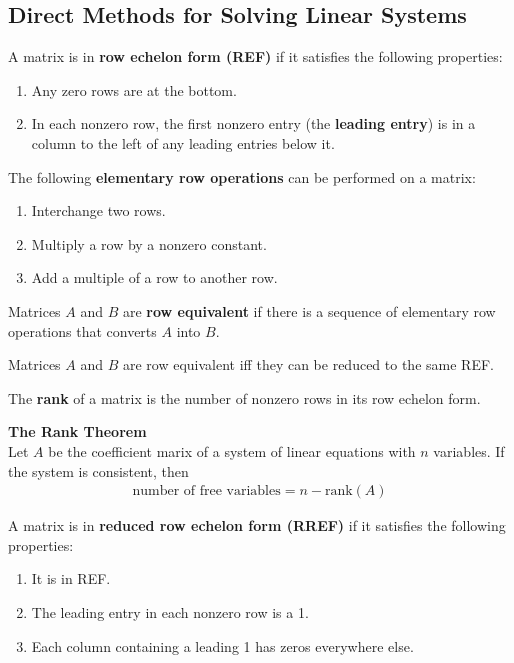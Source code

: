 \documentclass{article}
\begin{document}
\subsection{Direct Methods for Solving Linear Systems}
\begin{definition}
    A matrix is in \textbf{row echelon form (REF)} if it satisfies the following properties:
    \begin{enumerate}
        \item Any zero rows are at the bottom.
        \item In each nonzero row, the first nonzero entry (the \textbf{leading entry}) is in a column to the left of any leading entries below it.
    \end{enumerate}
\end{definition}
\begin{definition}
    The following \textbf{elementary row operations} can be performed on a matrix:
    \begin{enumerate}
        \item Interchange two rows.
        \item Multiply a row by a nonzero constant.
        \item Add a multiple of a row to another row.
    \end{enumerate}
\end{definition}
\begin{definition}
    Matrices $A$ and $B$ are \textbf{row equivalent} if there is a sequence of elementary row operations that converts $A$ into $B$.
\end{definition}
\begin{theorem}
    Matrices $A$ and $B$ are row equivalent iff they can be reduced to the same REF.
\end{theorem}
\begin{definition}
    The \textbf{rank} of a matrix is the number of nonzero rows in its row echelon form.
\end{definition}
\begin{theorem}
    \textbf{The Rank Theorem}\\
    Let $A$ be the coefficient marix of a system of linear equations with $n$ variables. If the system is consistent, then
    \begin{gather*}
        \text{number of free variables}=n-\text{rank}(A)
    \end{gather*}
\end{theorem}
\begin{definition}
    A matrix is in \textbf{reduced row echelon form (RREF)} if it satisfies the following properties:
    \begin{enumerate}
        \item It is in REF.
        \item The leading entry in each nonzero row is a 1.
        \item Each column containing a leading 1 has zeros everywhere else.
    \end{enumerate}
\end{definition}
\end{document}
